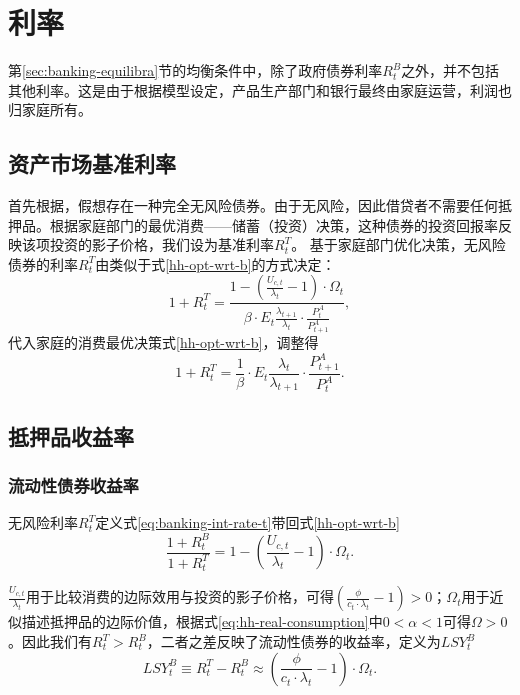 \section{利率}
第\ref{sec:banking-equilibra}节的均衡条件中，除了政府债券利率$R_t^B$之外，并不包括其他利率。这是由于根据模型设定，产品生产部门和银行最终由家庭运营，利润也归家庭所有。

\subsection{资产市场基准利率}
首先根据\cite{Goodfriend:2005ts}，假想存在一种完全无风险债券。由于无风险，因此借贷者不需要任何抵押品。根据家庭部门的最优消费——储蓄（投资）决策，这种债券的投资回报率反映该项投资的影子价格，我们设为基准利率$R_t^T$。
基于家庭部门优化决策，无风险债券的利率$R_t^T$由类似于式\eqref{hh-opt-wrt-b}的方式决定：
\begin{equation*}
1+R_t^T =\frac{
1 - \left(\frac{U_{c,t}}{\lambda_t} - 1 \right) \cdot \Omega_t
}{
  \beta \cdot E_t \frac{\lambda_{t+1}}{\lambda_{t}} \cdot \frac{P_t^A}{P_{t+1}^A}
},
\end{equation*}
代入家庭的消费最优决策式\eqref{hh-opt-wrt-b}，调整得
\begin{equation}
\label{eq:banking-int-rate-t}
1+R_t^T = \frac{1}{\beta} \cdot E_t \frac{\lambda_t}{\lambda_{t+1}} \cdot \frac{P^A_{t+1}}{P_t^A}.
\end{equation}

\subsection{抵押品收益率}
\subsubsection{流动性债券收益率}
无风险利率$R_t^T$定义式\eqref{eq:banking-int-rate-t}带回式\eqref{hh-opt-wrt-b}
\begin{equation*}
\frac{1+R_t^B}{1+R_t^T}=1-\left(
\frac{U_{c,t}}{\lambda_t} - 1
\right) \cdot \Omega_t.
\end{equation*}


$\frac{U_{c,t}}{\lambda_t}$用于比较消费的边际效用与投资的影子价格，可得$\left( \frac{\phi}{c_t \cdot \lambda_t}-1\right) >0$；$\Omega_t$用于近似描述抵押品的边际价值，根据式\eqref{eq:hh-real-consumption}中$0 < \alpha <1$可得$\Omega >0$。因此我们有$R_t^T > R_t^B$，二者之差反映了流动性债券的收益率，定义为$LSY_t^B$
\begin{equation}
\label{eq:banking-lqdt-yield-bond}
LSY_t^B \equiv R_t^T - R_t^B \approx \left(
\frac{\phi }{c_t \cdot \lambda_t} - 1
\right) \cdot \Omega_t.
\end{equation}

